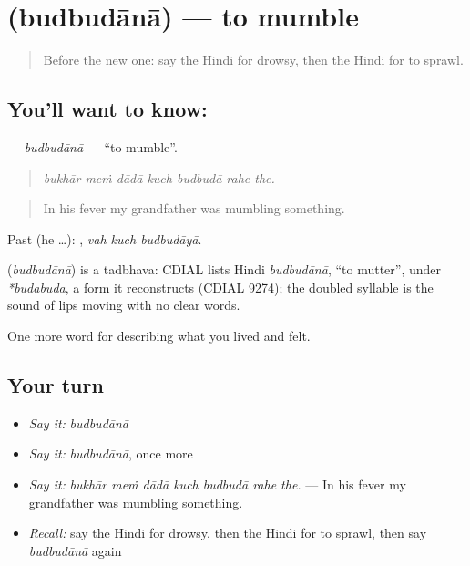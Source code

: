 \section[\texorpdfstring{\hi{बुदबुदाना} (budbudānā)}{बुदबुदाना (budbudānā)}]{ (budbudānā) — to mumble}

\label{lesson:HI-C496-budbudana}



\begin{quote}
Before the new one: say the Hindi for drowsy, then the Hindi for to sprawl.
\end{quote}

\subsection*{You'll want to know: }
\textbf{} — \emph{budbudānā} — \textquotedblleft{}to mumble\textquotedblright{}.

\begin{quote}
      
\end{quote}

\begin{quote}
\emph{bukhār meṁ dādā kuch budbudā rahe the.}
\end{quote}

\begin{quote}
In his fever my grandfather was mumbling something.
\end{quote}

Past (he …):   , \emph{vah kuch budbudāyā}.

\begin{cousinweb}
\textbf{} (\emph{budbudānā}) is a tadbhava: CDIAL lists Hindi \emph{budbudānā}, \textquotedblleft{}to mutter\textquotedblright{}, under \emph{*budabuda}, a form it reconstructs (CDIAL 9274); the doubled syllable is the sound of lips moving with no clear words.
\end{cousinweb}

\begin{grammarlens}[title={What you've built}]
One more word for describing what you lived and felt.
\end{grammarlens}

\subsection*{Your turn}
\begin{itemize}
\raggedright
  \item \emph{Say it:} \emph{budbudānā}
  \item \emph{Say it:} \emph{budbudānā}, once more
  \item \emph{Say it:} \emph{bukhār meṁ dādā kuch budbudā rahe the.} — In his fever my grandfather was mumbling something.
  \item \emph{Recall:} say the Hindi for drowsy, then the Hindi for to sprawl, then say \emph{budbudānā} again
\end{itemize}

